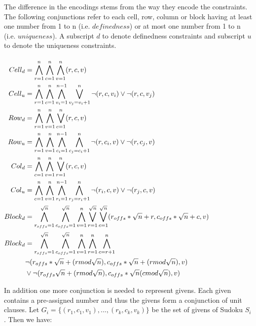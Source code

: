 \documentclass{article}
\begin{document}
The difference in the encodings stems from the way they encode the constraints. The following conjunctions refer to each cell, row, column or block having at least one number from 1 to n (i.e. $definedness$) or at most one number from 1 to n (i.e. $uniqueness$).
A subscript $d$ to denote definedness constraints and subscript $u$ to denote the uniqueness constraints. \\\\
$\begin{aligned}
Cell_{d} &= \bigwedge^{n}_{r=1}\bigwedge^{n}_{c=1}\bigwedge^{n}_{v=1} (r,c,v) &\\
Cell_{u} &= \bigwedge^{n}_{r=1}\bigwedge^{n}_{c=1}\bigwedge^{n-1}_{v_{i}=1} \bigvee^{n}_{v_{j}=v_{i}+1} \neg (r,c,v_{i}) \vee \neg (r,c,v_{j}) &\\
Row_{d} &= \bigwedge^{n}_{r=1}\bigwedge^{n}_{v=1}\bigvee^{n}_{c=1} (r,c,v) &\\
Row_{u} &= \bigwedge^{n}_{r=1}\bigwedge^{n}_{v=1}\bigwedge^{n-1}_{c_{i}=1} \bigwedge^{n}_{c_{j}=c_{i}+1} \neg (r,c_{i},v) \vee \neg (r,c_{j},v) &\\
Col_{d} &= \bigwedge^{n}_{c=1}\bigwedge^{n}_{v=1}\bigvee^{n}_{r=1} (r,c,v) &\\
Col_{u} &= \bigwedge^{n}_{c=1}\bigwedge^{n}_{v=1}\bigwedge^{n-1}_{r_{i}=1} \bigwedge^{n}_{r_{j}=r_{i}+1} \neg (r_{i},c,v) \vee \neg (r_{j},c,v) &\\
Block_{d} &= \bigwedge^{\sqrt{n}}_{r_{offs}=1}\bigwedge^{\sqrt{n}}_{c_{offs}=1}\bigwedge^{n}_{v=1}\bigvee_{r=1}^{\sqrt{n}}\bigvee_{c=1}^{\sqrt{n}}(r_{offs}*\sqrt{n}+r,c_{offs}*\sqrt{n}+c,v) &\\
Block_{d} &= \bigwedge^{\sqrt{n}}_{r_{offs}=1}\bigwedge^{\sqrt{n}}_{c_{offs}=1}\bigwedge^{n}_{v=1}\bigwedge_{r=1}^{n}\bigwedge_{c=r+1}^{n} &\\ & \neg (r_{offs}*\sqrt{n}+(r \space mod \sqrt{n}),c_{offs}*\sqrt{n}+(r \space mod \sqrt{n}),v) &\\
& \vee \neg (r_{offs}\sqrt{n}+(r \space mod \sqrt{n}),c_{offs}*\sqrt{n}(c \space mod \sqrt{n}),v)
\end{aligned}$

In addition one more conjunction is needed to represent givens. Each given contains a pre-assigned number and thus the givens form a conjunction of unit clauses.
Let $G_i=\{(r_1,c_1,v_1),...,(r_k,c_k,v_k)\}$ be the set of givens of Sudoku $S_i$. Then we have: \\
\end{document}
